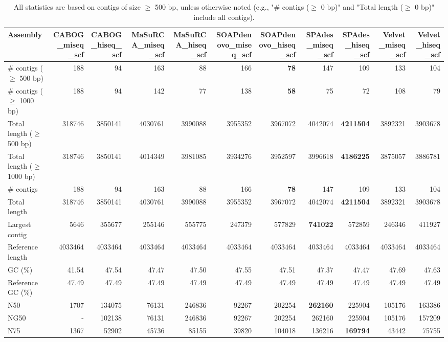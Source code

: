 \documentclass[12pt,a4paper]{article}
\begin{document}
\begin{table}[ht]
\begin{center}
\caption{All statistics are based on contigs of size $\geq$ 500 bp, unless otherwise noted (e.g., "\# contigs ($\geq$ 0 bp)" and "Total length ($\geq$ 0 bp)" include all contigs).}
\begin{tabular}{|l*{10}{|r}|}
\hline
Assembly & CABOG\_miseq\_scf & CABOG\_hiseq\_scf & MaSuRCA\_miseq\_scf & MaSuRCA\_hiseq\_scf & SOAPdenovo\_miseq\_scf & SOAPdenovo\_hiseq\_scf & SPAdes\_miseq\_scf & SPAdes\_hiseq\_scf & Velvet\_miseq\_scf & Velvet\_hiseq\_scf \\ \hline
\# contigs ($\geq$ 500 bp) & 188 & 94 & 163 & 88 & 166 & {\bf 78} & 147 & 109 & 133 & 104 \\ \hline
\# contigs ($\geq$ 1000 bp) & 188 & 94 & 142 & 77 & 138 & {\bf 58} & 75 & 72 & 108 & 79 \\ \hline
Total length ($\geq$ 500 bp) & 318746 & 3850141 & 4030761 & 3990088 & 3955352 & 3967072 & 4042074 & {\bf 4211504} & 3892321 & 3903678 \\ \hline
Total length ($\geq$ 1000 bp) & 318746 & 3850141 & 4014349 & 3981085 & 3934276 & 3952597 & 3996618 & {\bf 4186225} & 3875057 & 3886781 \\ \hline
\# contigs & 188 & 94 & 163 & 88 & 166 & {\bf 78} & 147 & 109 & 133 & 104 \\ \hline
Total length & 318746 & 3850141 & 4030761 & 3990088 & 3955352 & 3967072 & 4042074 & {\bf 4211504} & 3892321 & 3903678 \\ \hline
Largest contig & 5646 & 355677 & 255146 & 555775 & 247379 & 577829 & {\bf 741022} & 572859 & 246346 & 411927 \\ \hline
Reference length & 4033464 & 4033464 & 4033464 & 4033464 & 4033464 & 4033464 & 4033464 & 4033464 & 4033464 & 4033464 \\ \hline
GC (\%) & 41.54 & 47.54 & 47.47 & 47.50 & 47.55 & 47.51 & 47.37 & 47.47 & 47.69 & 47.63 \\ \hline
Reference GC (\%) & 47.49 & 47.49 & 47.49 & 47.49 & 47.49 & 47.49 & 47.49 & 47.49 & 47.49 & 47.49 \\ \hline
N50 & 1707 & 134075 & 76131 & 246836 & 92267 & 202254 & {\bf 262160} & 225904 & 105176 & 163386 \\ \hline
NG50 & - & 102138 & 76131 & 246836 & 92267 & 202254 & 262160 & 225904 & 105176 & 157209 \\ \hline
N75 & 1367 & 52902 & 45736 & 85155 & 39820 & 104018 & 136216 & {\bf 169794} & 43442 & 75755 \\ \hline

\end{tabular}
\end{center}
\end{table}
\end{document}
